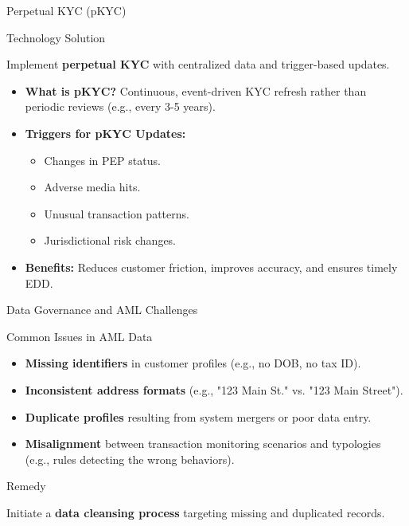 \documentclass{beamer}
\begin{document}
	\begin{frame}{Perpetual KYC (pKYC)}
		\begin{block}{Technology Solution}
			\begin{center}
				Implement \textbf{perpetual KYC} with centralized data and trigger-based updates.
			\end{center}
		\end{block}
		\begin{itemize}
			\item \textbf{What is pKYC?} Continuous, event-driven KYC refresh rather than periodic reviews (e.g., every 3-5 years).
			\item \textbf{Triggers for pKYC Updates:}
			\begin{itemize}
				\item Changes in PEP status.
				\item Adverse media hits.
				\item Unusual transaction patterns.
				\item Jurisdictional risk changes.
			\end{itemize}
			\item \textbf{Benefits:} Reduces customer friction, improves accuracy, and ensures timely EDD.
		\end{itemize}
	\end{frame}
	
	\begin{frame}{Data Governance and AML Challenges}
		\begin{block}{Common Issues in AML Data}
			\begin{itemize}
				\item \textbf{Missing identifiers} in customer profiles (e.g., no DOB, no tax ID).
				\item \textbf{Inconsistent address formats} (e.g., "123 Main St." vs. "123 Main Street").
				\item \textbf{Duplicate profiles} resulting from system mergers or poor data entry.
				\item \textbf{Misalignment} between transaction monitoring scenarios and typologies (e.g., rules detecting the wrong behaviors).
			\end{itemize}
		\end{block}
		\begin{block}{Remedy}
			\begin{center}
				Initiate a \textbf{data cleansing process} targeting missing and duplicated records.
			\end{center}
		\end{block}
	\end{frame}
	
\end{document}
